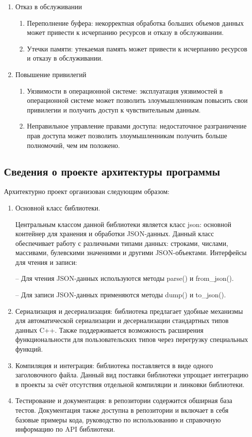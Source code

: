 \begin{enumerate}
    \item Отказ в обслуживании
    \begin{enumerate}
        \item Переполнение буфера: некорректная обработка больших объемов данных может привести к исчерпанию ресурсов и отказу в обслуживании.
        \item Утечки памяти: утекаемая память может привести к исчерпанию ресурсов и отказу в обслуживании.
    \end{enumerate}

    \item Повышение привилегий
    \begin{enumerate}
        \item Уязвимости в операционной системе: эксплуатация уязвимостей в операционной системе может позволить злоумышленникам повысить свои привилегии и получить доступ к чувствительным данным.
        \item Неправильное управление правами доступа: недостаточное разграничение прав доступа может позволить злоумышленникам получить больше полномочий, чем им положено.
    \end{enumerate}
\end{enumerate}

\subsection{Сведения о проекте архитектуры программы}

Архитектурно проект организован следующим образом:

\begin{enumerate}
    \item Основной класс библиотеки.

    Центральным классом данной библиотеки является класс json: основной контейнер для хранения и обработки JSON-данных. Данный класс обеспечивает работу с различными типами данных: строками, числами, массивами, булевскими значениями и другими JSON-объектами.
    Интерфейсы для чтения и записи:

    -- Для чтения JSON-данных используются методы parse() и from\_json().

    -- Для записи JSON-данных применяются методы dump() и to\_json().
    \item Сериализация и десериализация:
        библиотека предлагает удобные механизмы для автоматической сериализации и десериализации стандартных типов данных C++.
        Также поддерживается возможность расширения функциональности для пользовательских типов через перегрузку специальных функций.
    \item Компиляция и интеграция:
    библиотека поставляется в виде одного заголовочного файла. Данный вид поставки библиотеки упрощает интеграцию в проекты за счёт отсутствия отдельной компиляции и линковки библиотеки.
    \item Тестирование и документация:
    в репозитории содержится обширная база тестов. Документация также доступна в репозитории и включает в себя базовые примеры кода, руководство по использованию и справочную информацию по API библиотеки.
\end{enumerate}


